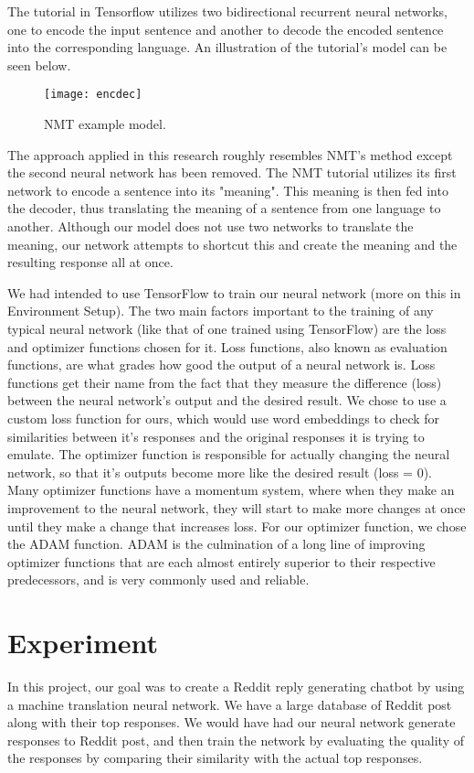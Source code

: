 \documentclass[11pt,twocolumn]{article}
\begin{document}
The tutorial in Tensorflow utilizes two bidirectional recurrent neural networks, one to encode the input sentence and another to decode the encoded sentence into the corresponding language.  An illustration of the tutorial's model can be seen below.
\begin{figure}[htp]
    \centering
        \texttt{[image: encdec]}
        \caption{NMT example model. \cite{Tensorflowtutorial}}
        \label{fig:encdec}
\end{figure}
The approach applied in this research roughly resembles NMT's method except the second neural network has been removed.  The NMT tutorial utilizes its first network to encode a sentence into its "meaning".  This meaning is then fed into the decoder, thus translating the meaning of a sentence from one language to another.  Although our model does not use two networks to translate the meaning, our network attempts to shortcut this and create the meaning and the resulting response all at once.

We had intended to use TensorFlow to train our neural network (more on this in Environment Setup).  The two main factors important to the training of any typical neural network (like that of one trained using TensorFlow) are the loss and optimizer functions chosen for it.  Loss functions, also known as evaluation functions, are what grades how good the output of a neural network is.  Loss functions get their name from the fact that they measure the difference (loss) between the neural network's output and the desired result.  We chose to use a custom loss function for ours, which would use word embeddings to check for similarities between it's responses and the original responses it is trying to emulate.  The optimizer function is responsible for actually changing the neural network, so that it's outputs become more like the desired result (loss = 0).  Many optimizer functions have a momentum system, where when they make an improvement to the neural network, they will start to make more changes at once until they make a change that increases loss.  For our optimizer function, we chose the ADAM function.  ADAM is the culmination of a long line of improving optimizer functions that are each almost entirely superior to their respective predecessors, and is very commonly used and reliable.

\section{Experiment}
In this project, our goal was to create a Reddit reply generating chatbot by using a machine translation neural network.  We have a large database of Reddit post along with their top responses.  We would have had our neural network generate responses to Reddit post, and then train the network by evaluating the quality of the responses by comparing their similarity with the actual top responses.
\end{document}
